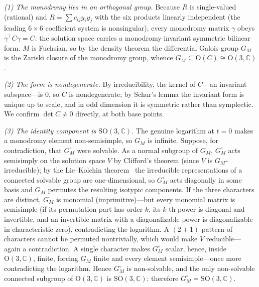 \documentclass[11pt]{article}
\theoremstyle{plain}
\theoremstyle{remark}
\begin{document}
\emph{(1) The monodromy lies in an orthogonal group.} Because $R$ is single-valued (rational) and
$R=\sum c_{ij}y_iy_j$ with the six products linearly independent (the leading $6\times6$ coefficient system is
nonsingular), every monodromy matrix $\gamma$ obeys $\gamma^{\!\top}C\gamma=C$: the solution space carries a
monodromy-invariant symmetric bilinear form. $M$ is Fuchsian, so by the density theorem the differential Galois
group $G_M$ is the Zariski closure of the monodromy group, whence $G_M\subseteq\mathrm{O}(C)\cong\mathrm{O}(3,\mathbb{C})$.

\emph{(2) The form is nondegenerate.} By irreducibility, the kernel of $C$---an invariant subspace---is $0$, so $C$
is nondegenerate; by Schur's lemma the invariant form is unique up to scale, and in odd dimension it is symmetric
rather than symplectic. We confirm $\det C\neq0$ directly, at both base points.

\emph{(3) The identity component is $\mathrm{SO}(3,\mathbb{C})$.} The genuine logarithm at $t=0$ makes a monodromy
element non-semisimple, so $G_M$ is infinite. Suppose, for contradiction, that $G_M^\circ$ were solvable. As a normal
subgroup of $G_M$, $G_M^\circ$ acts semisimply on the solution space $V$ by Clifford's theorem (since $V$ is
$G_M$-irreducible); by the Lie--Kolchin theorem~\cite{vdPutSinger} the irreducible representations of a connected solvable group are
one-dimensional, so $G_M^\circ$ acts diagonally in some basis and $G_M$ permutes the resulting isotypic components. If
the three characters are distinct, $G_M$ is monomial (imprimitive)---but every monomial matrix is semisimple (if its
permutation part has order $k$, its $k$-th power is diagonal and invertible, and an invertible matrix with a
diagonalizable power is diagonalizable in characteristic zero), contradicting the logarithm. A $(2{+}1)$ pattern of
characters cannot be permuted nontrivially, which would make $V$ reducible---again a contradiction. A single
character makes $G_M^\circ$ scalar, hence, inside $\mathrm{O}(3,\mathbb{C})$, finite, forcing $G_M$ finite and every
element semisimple---once more contradicting the logarithm. Hence $G_M^\circ$ is non-solvable, and the only
non-solvable connected subgroup of $\mathrm{O}(3,\mathbb{C})$ is $\mathrm{SO}(3,\mathbb{C})$; therefore
$G_M^\circ=\mathrm{SO}(3,\mathbb{C})$.
\end{document}
